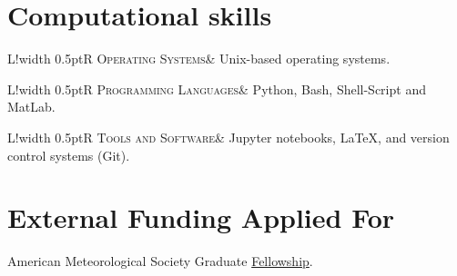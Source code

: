\documentclass[10pt]{article}
\newcommand\VRule{\color{lightgray}\vrule width 0.5pt}
\begin{document}
\section*{Computational skills}
\vspace{.3cm}
\begin{tabular}{L!{\VRule}R}
\textsc{Operating Systems}& Unix-based 
operating systems. \\
\end{tabular}
\newline \noindent 
\newline \noindent
\begin{tabular}{L!{\VRule}R}
\textsc{Programming Languages}& Python, Bash, Shell-Script and MatLab.  \\
\end{tabular}
\newline \noindent 
\newline \noindent
\begin{tabular}{L!{\VRule}R}
\textsc{Tools and Software}& Jupyter notebooks, LaTeX, and version control systems (Git). \\
\end{tabular}

\vspace{.3cm}
\section*{External Funding Applied For}
\vspace{.3cm}
\hspace{1cm}American Meteorological Society Graduate \href{https://www.ametsoc.org/index.cfm/ams/information-for/students/ams-scholarships-and-fellowships/ams-graduate-fellowships/}{Fellowship}.


\end{document}
